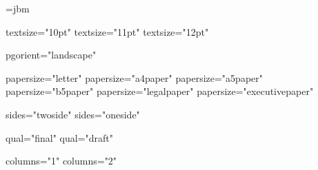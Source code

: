 \def\addtocounter#1#2{%
    \expandafter\global\advance\csname c@#1\endcsname #2\relax
    \msihmode
    \msiopentag{texb}{<texb enc="1" name="addtocounter">}
       \msitag{<![CDATA[\addtocounter{#1}{#2}]]>}%
    \msiclosetag{texb}{</texb>}}


\msi@inline@proc={jbm}







\def\msi@stylesheets{\msitag{<?xml-stylesheet href="css/my.css" type="text/css"?>^^0a}}


\def\@brace#1{\char123\relax#1\char125\relax}

\def\msi@br{\ifvmode\msitag{^^0a}\fi}


\newif\ifmsi@firstopt
\msi@firstopttrue


\expandafter\def\csname 10ptAttrib\endcsname{textsize="10pt"}
\expandafter\def\csname 11ptAttrib\endcsname{textsize="11pt"}
\expandafter\def\csname 12ptAttrib\endcsname{textsize="12pt"}

\expandafter\def\csname landscapeAttrib\endcsname{pgorient="landscape"}

\expandafter\def\csname letterpaperAttrib\endcsname{papersize="letter"}
\expandafter\def\csname a4paperAttrib\endcsname{papersize="a4paper"}
\expandafter\def\csname a5paperAttrib\endcsname{papersize="a5paper"}
\expandafter\def\csname b5paperAttrib\endcsname{papersize="b5paper"}
\expandafter\def\csname legalpaperAttrib\endcsname{papersize="legalpaper"}
\expandafter\def\csname executivepaperAttrib\endcsname{papersize="executivepaper"}

\expandafter\def\csname twosideAttrib\endcsname{sides="twoside"}
\expandafter\def\csname onesideAttrib\endcsname{sides="oneside"}

\expandafter\def\csname finalAttrib\endcsname{qual="final"}
\expandafter\def\csname draftAttrib\endcsname{qual="draft"}

\expandafter\def\csname onecolumnAttrib\endcsname{columns="1"}
\expandafter\def\csname twocolumnAttrib\endcsname{columns="2"}

